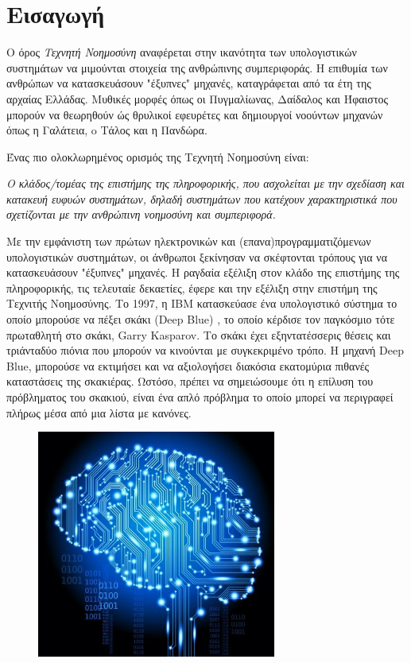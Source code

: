 \chapter{Εισαγωγή}
\label{chapter:intro}

Ο όρος \emph{Τεχνητή Νοημοσύνη} αναφέρεται στην ικανότητα των υπολογιστικών
συστημάτων να μιμούνται στοιχεία της ανθρώπινης συμπεριφοράς.
Η επιθυμία των ανθρώπων να κατασκευάσουν "έξυπνες" μηχανές, καταγράφεται από
τα έτη της αρχαίας Ελλάδας. Μυθικές μορφές όπως οι Πυγμαλίωνας, Δαίδαλος και
Ήφαιστος μπορούν να θεωρηθούν ώς θρυλικοί εφευρέτες και δημιουργοί νοούντων
μηχανών όπως η Γαλάτεια, o Τάλος και η Πανδώρα.

Ένας πιο ολοκλωρημένος ορισμός της Τεχνητή Νοημοσύνη είναι:
\begin{displayquote}
\emph{
  Ο κλάδος/τομέας της επιστήμης της πληροφορικής, που ασχολείται
  με την σχεδίαση και κατακευή ευφυών συστημάτων, δηλαδή συστημάτων που
  κατέχουν χαρακτηριστικά που σχετίζονται με την ανθρώπινη νοημοσύνη και συμπεριφορά.
}
\end{displayquote}
Με την εμφάνιστη των πρώτων ηλεκτρονικών και (επανα)προγραμματιζόμενων υπολογιστικών συστημάτων,
οι άνθρωποι ξεκίνησαν να σκέφτονται τρόπους για να κατασκευάσουν "έξυπνες" μηχανές.
H ραγδαία εξέλιξη στον κλάδο της επιστήμης της πληροφορικής, τις τελευταίε
δεκαετίες, έφερε και την εξέλιξη στην επιστήμη της Τεχνιτής Νοημοσύνης.
Το 1997, η IBM κατασκεύασε ένα υπολογιστικό σύστημα το οποίο μπορούσε να
πέξει σκάκι (Deep Blue) \cite{campbell2002deep}, το οποίο κέρδισε τον παγκόσμιο
τότε πρωταθλητή στο σκάκι, Garry Kasparov. Το σκάκι έχει εξηντατέσσερις θέσεις
και τριάνταδύο πιόνια που μπορούν να κινούνται με συγκεκριμένο τρόπο. H μηχανή
Deep Blue, μπορούσε να εκτιμήσει και να αξιολογήσει διακόσια εκατομύρια
πιθανές καταστάσεις της σκακιέρας. Ωστόσο, πρέπει να σημειώσουμε ότι η επίλυση του
πρόβληματος του σκακιού, είναι ένα απλό πρόβλημα το οποίο μπορεί να περιγραφεί
πλήρως μέσα από μια λίστα με κανόνες.
\begin{figure}[!ht]
  \centering
  \includegraphics[width=0.7\textwidth]{./images/chapter3/building_a_brain.jpg}
  \label{fig:AI_1}
\end{figure}
